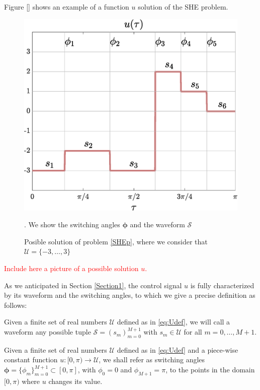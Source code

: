 Figure \ref{} shows an example of a function $u$ solution of the SHE problem. 

\begin{figure}
	\centering
	\includegraphics[scale=0.375]{img/fig01.eps} 
	\caption{Posible solution of problem \ref{SHEp}, where we consider that $\mathcal{U} = \{-3,\dots,3\}$}. We show the switching angles $\bm{\phi}$ and the waveform $\mathcal{S}$
\end{figure}
\textcolor{red}{Include here a picture of a possible solution $u$.}

As we anticipated in Section \ref{Section1}, the control signal $u$ is fully characterized by its waveform and the switching angles, to which we give a precise definition as follows:
\newline
\begin{definition}\label{def:waveform}
Given a finite set of real numbers $\mathcal U$ defined as in \eqref{eq:Udef}, we will call a waveform any possible tuple $\mathcal S = (s_m)_{m=0}^{M+1}$ with $s_m\in \mathcal U$ for all $m=0,\ldots,M+1$.
\end{definition}
 
\begin{definition}\label{def:switchingAngles}
Given a finite set of real numbers $\mathcal U$ defined as in \eqref{eq:Udef} and a piece-wise constant function $u:[0,\pi) \rightarrow \mathcal{U}$, we shall refer as switching angles $\bm{\phi} = \{\phi_m\}_{m=0}^{M+1}\subset[0,\pi]$, with $\phi_0 = 0$ and $\phi_{M+1} = \pi$, to the points in the domain $[0,\pi)$ where $u$ changes its value. 
\end{definition}

